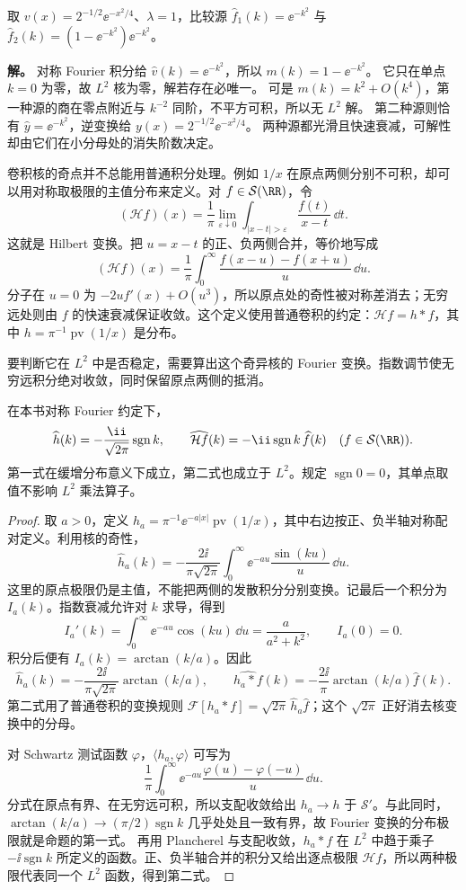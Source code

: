 \begin{workedexample}[高斯卷积的非零小分母仍可妨碍求解]
取 $v(x)=2^{-1/2}\ee^{-x^2/4}$、$\lambda=1$，比较源 $\widehat f_1(k)=\ee^{-k^2}$ 与 $\widehat f_2(k)=(1-\ee^{-k^2})\ee^{-k^2}$。

\textbf{解。} 对称 Fourier 积分给 $\widehat v(k)=\ee^{-k^2}$，所以 $m(k)=1-\ee^{-k^2}$。
它只在单点 $k=0$ 为零，故 $L^2$ 核为零，解若存在必唯一。
可是 $m(k)=k^2+O(k^4)$，第一种源的商在零点附近与 $k^{-2}$ 同阶，不平方可积，所以无 $L^2$ 解。
第二种源则恰有 $\widehat y=\ee^{-k^2}$，逆变换给 $y(x)=2^{-1/2}\ee^{-x^2/4}$。
两种源都光滑且快速衰减，可解性却由它们在小分母处的消失阶数决定。
\end{workedexample}
卷积核的奇点并不总能用普通积分处理。例如 $1/x$ 在原点两侧分别不可积，却可以用对称取极限的主值分布来定义。对 $f\in\mathcal S(\RR)$，令
\[
(\mathcal Hf)(x)=\frac1\pi\lim_{\varepsilon\downarrow0}
\int_{|x-t|>\varepsilon}\frac{f(t)}{x-t}\,\dd t.
\]
这就是 Hilbert 变换。把 $u=x-t$ 的正、负两侧合并，等价地写成
\[
(\mathcal Hf)(x)=\frac1\pi\int_0^\infty
\frac{f(x-u)-f(x+u)}u\,\dd u.
\]
分子在 $u=0$ 为 $-2uf'(x)+O(u^3)$，所以原点处的奇性被对称差消去；无穷远处则由 $f$ 的快速衰减保证收敛。这个定义使用普通卷积的约定：$\mathcal Hf=h*f$，其中 $h=\pi^{-1}\operatorname{pv}(1/x)$ 是分布。

要判断它在 $L^2$ 中是否稳定，需要算出这个奇异核的 Fourier 变换。指数调节使无穷远积分绝对收敛，同时保留原点两侧的抵消。
\begin{proposition}
在本书对称 Fourier 约定下，
\[
\widehat h(k)=-\frac{\ii}{\sqrt{2\pi}}\operatorname{sgn}k,
\qquad
\widehat{\mathcal Hf}(k)=-\ii\operatorname{sgn}k\,\widehat f(k)
\quad(f\in\mathcal S(\RR)).
\]
第一式在缓增分布意义下成立，第二式也成立于 $L^2$。规定 $\operatorname{sgn}0=0$，其单点取值不影响 $L^2$ 乘法算子。
\end{proposition}
\begin{proof}
取 $a>0$，定义 $h_a=\pi^{-1}\ee^{-a|x|}\operatorname{pv}(1/x)$，其中右边按正、负半轴对称配对定义。利用核的奇性，
\[
\widehat h_a(k)
=-\frac{2\ii}{\pi\sqrt{2\pi}}
\int_0^\infty \ee^{-au}\frac{\sin(ku)}u\,\dd u.
\]
这里的原点极限仍是主值，不能把两侧的发散积分分别变换。记最后一个积分为 $I_a(k)$。指数衰减允许对 $k$ 求导，得到
\[
I_a'(k)=\int_0^\infty \ee^{-au}\cos(ku)\,\dd u
=\frac a{a^2+k^2},\qquad I_a(0)=0.
\]
积分后便有 $I_a(k)=\arctan(k/a)$。因此
\[
\widehat h_a(k)=-\frac{2\ii}{\pi\sqrt{2\pi}}\arctan(k/a),
\qquad
\widehat{h_a*f}(k)=-\frac{2\ii}{\pi}\arctan(k/a)\widehat f(k).
\]
第二式用了普通卷积的变换规则 $\mathcal F[h_a*f]=\sqrt{2\pi}\,\widehat h_a\widehat f$；这个 $\sqrt{2\pi}$ 正好消去核变换中的分母。

对 Schwartz 测试函数 $\varphi$，$\langle h_a,\varphi\rangle$ 可写为
\[
\frac1\pi\int_0^\infty \ee^{-au}
\frac{\varphi(u)-\varphi(-u)}u\,\dd u.
\]
分式在原点有界、在无穷远可积，所以支配收敛给出 $h_a\to h$ 于 $\mathcal S'$。与此同时，$\arctan(k/a)\to(\pi/2)\operatorname{sgn}k$ 几乎处处且一致有界，故 Fourier 变换的分布极限就是命题的第一式。
再用 Plancherel 与支配收敛，$h_a*f$ 在 $L^2$ 中趋于乘子 $-\ii\operatorname{sgn}k$ 所定义的函数。正、负半轴合并的积分又给出逐点极限 $\mathcal Hf$，所以两种极限代表同一个 $L^2$ 函数，得到第二式。
\end{proof}

